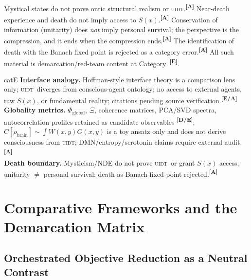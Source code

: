 \documentclass[12pt,a4paper,twoside]{article}
\theoremstyle{plain}
\theoremstyle{definition}
\theoremstyle{remark}
\newcommand{\UIDT}{\textsc{uidt}}
\newcommand{\catmark}[1]{\textsuperscript{\textsf{\textbf{[#1]}}}}
\begin{document}
\begin{governancebox}
Mystical states do not prove ontic structural realism or \UIDT.\catmark{A} Near-death experience and death do not imply access to $S(x)$.\catmark{A} Conservation of information (unitarity) does \emph{not} imply personal survival; the perspective is the compression, and it ends when the compression ends.\catmark{A} The identification of death with the Banach fixed point is rejected as a category error.\catmark{A} All such material is demarcation/red-team content at Category~\catmark{E}.
\end{governancebox}

\begin{evidencebox}{catE}
\textbf{Interface analogy.} Hoffman-style interface theory is a comparison lens only; \UIDT\ diverges from conscious-agent ontology; no access to external agents, raw $S(x)$, or fundamental reality; citations pending source
verification.\catmark{E/A}\\[0.3em]
\textbf{Globality metrics.} $\Phi_{\mathrm{global}}$, $\Xi$, coherence matrices, PCA/SVD spectra, autocorrelation profiles retained as candidate observables \catmark{D/E}; $C[\rho_{\mathrm{brain}}]\sim\int W(x,y)G(x,y)$ is a toy ansatz only and does not derive consciousness from \UIDT; DMN/entropy/serotonin claims
require external audit.\catmark{A}\\[0.3em]
\textbf{Death boundary.} Mysticism/NDE do not prove \UIDT\ or grant $S(x)$ access; unitarity $\neq$ personal survival; death-as-Banach-fixed-point rejected.\catmark{A}
\end{evidencebox}

\newpage
\section{Comparative Frameworks and the Demarcation Matrix}
\label{sec:orch-or-comparison}

\subsection{Orchestrated Objective Reduction as a Neutral Contrast}
\label{subsec:orch-or}
\end{document}
